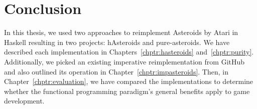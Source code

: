 \documentclass[
  digital, %
  color,   %
  table,   %
  oneside, %
  lof,     %
  lot,     %
]{fithesis3}
\newcommand{\cpp}{C\nolinebreak\texttt{+}\nolinebreak\texttt{+}}
\begin{document}
{%










\chapter*{Conclusion}

In this thesis, we used two approaches to reimplement Asteroids by Atari in Haskell
resulting in two projects: hAsteroids and pure-asteroids.
We have described each implementation in Chapters~\ref{chptr:hasteroids} and~\ref{chptr:purity}.
Additionally, we picked an existing imperative reimplementation from GitHub and also
outlined its operation in Chapter~\ref{chptr:impasteroids}.
Then, in Chapter~\ref{chptr:evaluation}, we have compared the implementations
to determine whether the functional programming paradigm's
general benefits apply to game development.

}
\end{document}
